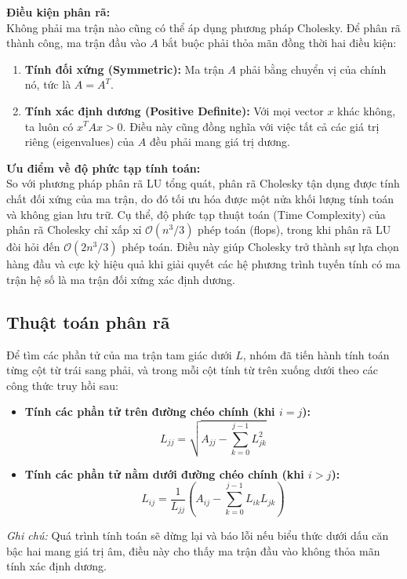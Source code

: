 \documentclass[a4paper,12pt]{report}
\begin{document}
\textbf{Điều kiện phân rã:}\\
Không phải ma trận nào cũng có thể áp dụng phương pháp Cholesky. Để phân rã thành công, ma trận đầu vào $A$ bắt buộc phải thỏa mãn đồng thời hai điều kiện:
\begin{enumerate}
  \item \textbf{Tính đối xứng (Symmetric):} Ma trận $A$ phải bằng chuyển vị của chính nó, tức là $A = A^T$.
  \item \textbf{Tính xác định dương (Positive Definite):} Với mọi vector $x$ khác không, ta luôn có $x^T A x > 0$. Điều này cũng đồng nghĩa với việc tất cả các giá trị riêng (eigenvalues) của $A$ đều phải mang giá trị dương.
\end{enumerate}

\textbf{Ưu điểm về độ phức tạp tính toán:}\\
So với phương pháp phân rã LU tổng quát, phân rã Cholesky tận dụng được tính chất đối xứng của ma trận, do đó tối ưu hóa được một nửa khối lượng tính toán và không gian lưu trữ. Cụ thể, độ phức tạp thuật toán (Time Complexity) của phân rã Cholesky chỉ xấp xỉ $\mathcal{O}(n^3/3)$ phép toán (flops), trong khi phân rã LU đòi hỏi đến $\mathcal{O}(2n^3/3)$ phép toán. Điều này giúp Cholesky trở thành sự lựa chọn hàng đầu và cực kỳ hiệu quả khi giải quyết các hệ phương trình tuyến tính có ma trận hệ số là ma trận đối xứng xác định dương.

\subsection{Thuật toán phân rã}
Để tìm các phần tử của ma trận tam giác dưới $L$, nhóm đã tiến hành tính toán từng cột từ trái sang phải, và trong mỗi cột tính từ trên xuống dưới theo các công thức truy hồi sau:

\begin{itemize}
  \item \textbf{Tính các phần tử trên đường chéo chính (khi $i = j$):}
    \[
      L_{jj} = \sqrt{A_{jj} - \sum_{k=0}^{j-1} L_{jk}^2}
    \]

  \item \textbf{Tính các phần tử nằm dưới đường chéo chính (khi $i > j$):}
    \[
      L_{ij} = \frac{1}{L_{jj}} \left( A_{ij} - \sum_{k=0}^{j-1} L_{ik} L_{jk} \right)
    \]
\end{itemize}

\textit{Ghi chú:} Quá trình tính toán sẽ dừng lại và báo lỗi nếu biểu thức dưới dấu căn bậc hai mang giá trị âm, điều này cho thấy ma trận đầu vào không thỏa mãn tính xác định dương.
\end{document}
